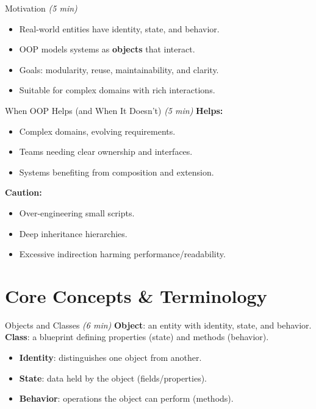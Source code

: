 \documentclass[aspectratio=169,11pt]{beamer}
\newcommand{\term}[1]{\textbf{#1}}
\newcommand{\mins}[1]{\textit{(#1 min)}}
\begin{document}
\begin{frame}{Motivation \mins{5}}
  \begin{itemize}
    \item Real-world entities have identity, state, and behavior.
    \item OOP models systems as \term{objects} that interact.
    \item Goals: modularity, reuse, maintainability, and clarity.
    \item Suitable for complex domains with rich interactions.
  \end{itemize}
\end{frame}

\begin{frame}{When OOP Helps (and When It Doesn’t) \mins{5}}
  \textbf{Helps:}
  \begin{itemize}
    \item Complex domains, evolving requirements.
    \item Teams needing clear ownership and interfaces.
    \item Systems benefiting from composition and extension.
  \end{itemize}
  \vspace{0.5em}
  \textbf{Caution:}
  \begin{itemize}
    \item Over-engineering small scripts.
    \item Deep inheritance hierarchies.
    \item Excessive indirection harming performance/readability.
  \end{itemize}
\end{frame}

\section{Core Concepts \& Terminology}

\begin{frame}{Objects and Classes \mins{6}}
  \term{Object}: an entity with identity, state, and behavior.\\[0.4em]
  \term{Class}: a blueprint defining properties (state) and methods (behavior).\\[0.8em]
  \begin{itemize}
    \item \term{Identity}: distinguishes one object from another.
    \item \term{State}: data held by the object (fields/properties).
    \item \term{Behavior}: operations the object can perform (methods).
  \end{itemize}
\end{frame}
\end{document}
